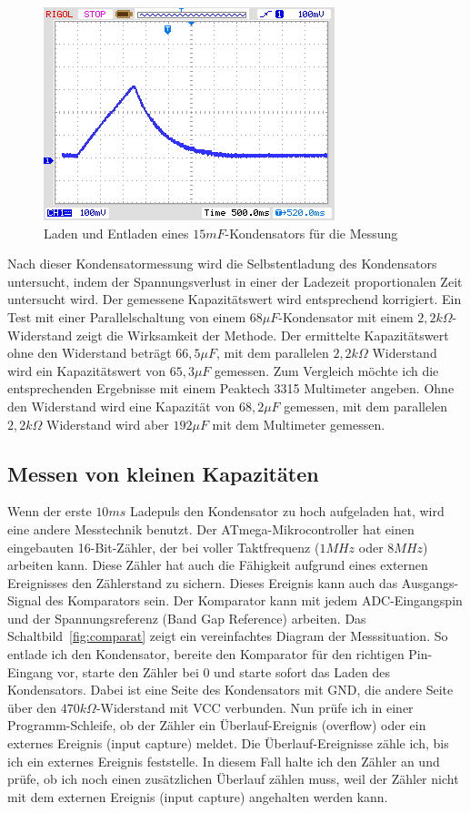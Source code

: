 \begin{figure}[H]
  \centering
    \includegraphics[]{../PNG/charge_15mF.png}
  \caption{Laden und Entladen eines \(15mF\)-Kondensators für die Messung}
  \label{pic:c15mF}
\end{figure}

Nach dieser Kondensatormessung wird die Selbstentladung des Kondensators untersucht, indem der
Spannungsverlust in einer der Ladezeit proportionalen Zeit untersucht wird.
Der gemessene Kapazitätswert wird entsprechend korrigiert. Ein Test mit einer Parallelschaltung von
einem \(68\mu F\)-Kondensator mit einem \(2,2k\Omega\)-Widerstand zeigt die
Wirksamkeit der Methode. Der ermittelte Kapazitätswert ohne den Widerstand beträgt \(66,5\mu F\),
mit dem parallelen \(2,2k\Omega\) Widerstand wird ein Kapazitätswert von \(65,3\mu F\) gemessen.
Zum Vergleich möchte ich die entsprechenden Ergebnisse mit einem Peaktech 3315 Multimeter angeben.
Ohne den Widerstand wird eine Kapazität von \(68,2\mu F\) gemessen, mit dem parallelen \(2,2k\Omega\)
Widerstand wird aber \(192\mu F\) mit dem Multimeter gemessen.

\subsection{Messen von kleinen Kapazitäten}
Wenn der erste \(10ms\) Ladepuls den Kondensator zu hoch aufgeladen hat, wird eine andere Messtechnik benutzt.
Der ATmega-Mikrocontroller hat einen eingebauten 16-Bit-Zähler, der bei voller Taktfrequenz (\(1MHz\) oder \(8MHz\)) arbeiten kann.
Diese Zähler hat auch die Fähigkeit aufgrund eines externen Ereignisses den Zählerstand zu sichern.
Dieses Ereignis kann auch das Ausgangs-Signal des Komparators sein.
Der Komparator kann mit jedem ADC-Eingangspin und der Spannungsreferenz (Band Gap Reference) arbeiten.
Das Schaltbild~\ref{fig:comparat} zeigt ein vereinfachtes Diagram der Messsituation.
So entlade ich den Kondensator, bereite den Komparator für den richtigen Pin-Eingang vor, starte den Zähler bei 0 und
starte sofort das Laden des Kondensators.
Dabei ist eine Seite des Kondensators mit GND, die andere Seite über den \(470k\Omega\)-Widerstand mit VCC verbunden.
Nun prüfe ich in einer Programm-Schleife, ob der Zähler ein Überlauf-Ereignis (overflow) oder ein
 externes Ereignis (input capture) meldet.
Die Überlauf-Ereignisse zähle ich, bis ich ein externes Ereignis feststelle.
In diesem Fall halte ich den Zähler an und prüfe, ob ich noch einen zusätzlichen Überlauf zählen muss, 
weil der Zähler nicht mit dem externen Ereignis (input capture) angehalten werden kann.


